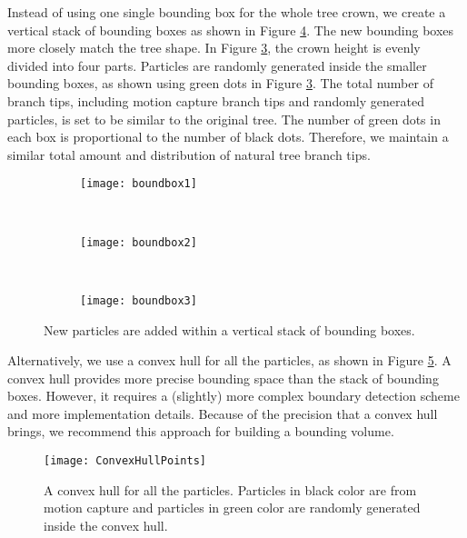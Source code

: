 Instead of using one single bounding box for the whole tree crown, we create a vertical stack of bounding boxes as shown in Figure \ref{fig:boundbox}. The new bounding boxes more closely match the tree shape. In Figure \ref{fig:boundboxsubfig3}, the crown height is evenly divided into four parts. Particles are randomly generated inside the smaller bounding boxes, as shown using green dots in Figure \ref{fig:boundboxsubfig3}. The total number of branch tips, including motion capture branch tips and randomly generated particles, is set to be similar to the original tree. The number of green dots in each box is proportional to the number of black dots. Therefore, we maintain a similar total amount and distribution of natural tree branch tips.

\begin{figure}
\centering
        \begin{subfigure}[b]{0.2\textwidth}
                \centering
                \texttt{[image: boundbox1]}
                \caption{}
                \label{fig:boundboxsubfig1}
        \end{subfigure}
        ~
        \begin{subfigure}[b]{0.27\textwidth}
                \centering
                \texttt{[image: boundbox2]}
                \caption{}
                \label{fig:boundboxsubfig2}
        \end{subfigure} 
        ~
        \begin{subfigure}[b]{0.2\textwidth}
                \centering
                \texttt{[image: boundbox3]}
                \caption{}
                \label{fig:boundboxsubfig3}
        \end{subfigure}             
\caption{New particles are added within a vertical stack of bounding boxes.}
\label{fig:boundbox}
\end{figure}

Alternatively, we use a convex hull for all the particles, as shown in Figure \ref{fig:ConvexHullPoints}. A convex hull provides more precise bounding space than the stack of bounding boxes. However, it requires a (slightly) more complex boundary detection scheme and more implementation details. Because of the precision that a convex hull brings, we recommend this approach for building a bounding volume.

\begin{figure}[!t]
\centering
\texttt{[image: ConvexHullPoints]}
\caption[A convex hull for all the particles.]{A convex hull for all the particles. Particles in black color are from motion capture and particles in green color are randomly generated inside the convex hull.}
\label{fig:ConvexHullPoints}
\end{figure}

